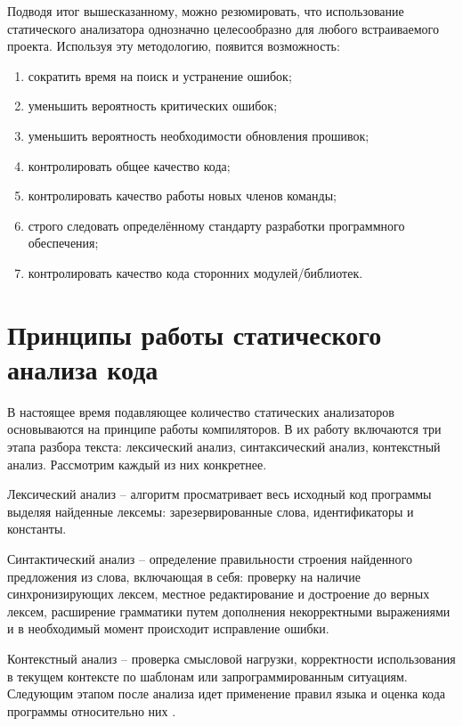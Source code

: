 Подводя итог вышесказанному, можно резюмировать, что использование статического анализатора однозначно целесообразно для любого встраиваемого проекта. Используя эту методологию, появится возможность:

\begin{enumerate}

    \item сократить время на поиск и устранение ошибок;
    \item уменьшить вероятность критических ошибок;
    \item уменьшить вероятность необходимости обновления прошивок;
    \item контролировать общее качество кода;
    \item контролировать качество работы новых членов команды;
    \item строго следовать определённому стандарту разработки программного обеспечения;
    \item контролировать качество кода сторонних модулей/библиотек.

\end{enumerate}

\section{Принципы работы статического анализа кода}

В настоящее время подавляющее количество статических анализаторов основываются на принципе работы компиляторов. В их работу включаются три этапа разбора текста: лексический анализ, синтаксический анализ, контекстный анализ. Рассмотрим каждый из них конкретнее.

Лексический анализ -- алгоритм просматривает весь исходный код программы выделяя найденные лексемы: зарезервированные слова, идентификаторы и константы. 

Синтактический анализ -- определение правильности строения найденного предложения из слова, включающая в себя: проверку на наличие синхронизирующих лексем, местное редактирование и достроение до верных лексем, расширение грамматики путем дополнения некорректными выражениями и в необходимый момент происходит исправление ошибки. 

Контекстный анализ -- проверка смысловой нагрузки, корректности использования в текущем контексте по шаблонам или запрограммированным ситуациям. Следующим этапом после анализа идет применение правил языка и оценка кода программы относительно них \cite{16}.

